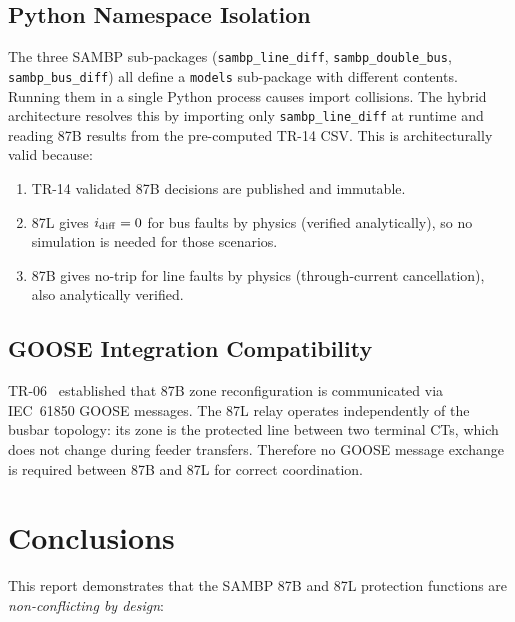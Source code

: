 \documentclass[11pt, a4paper]{article}
\begin{document}
\subsection{Python Namespace Isolation}

The three SAMBP sub-packages (\texttt{sambp\_line\_diff},
\texttt{sambp\_double\_bus}, \texttt{sambp\_bus\_diff}) all define a
\texttt{models} sub-package with different contents.  Running them in a
single Python process causes import collisions.  The hybrid architecture
resolves this by importing only \texttt{sambp\_line\_diff} at runtime and
reading 87B results from the pre-computed TR-14 CSV.  This is architecturally
valid because:

\begin{enumerate}
  \item TR-14 validated 87B decisions are published and immutable.
  \item 87L gives $i_{\rm diff}=0$ for bus faults by physics (verified
        analytically), so no simulation is needed for those scenarios.
  \item 87B gives no-trip for line faults by physics (through-current
        cancellation), also analytically verified.
\end{enumerate}

\subsection{GOOSE Integration Compatibility}

TR-06~\cite{IEC_61850_8_1} established that 87B zone reconfiguration is
communicated via IEC~61850 GOOSE messages.  The 87L relay operates
independently of the busbar topology: its zone is the protected line
between two terminal CTs, which does not change during feeder transfers.
Therefore no GOOSE message exchange is required between 87B and 87L for
correct coordination.


\section{Conclusions}
\label{sec:conclusions}

This report demonstrates that the SAMBP 87B and 87L protection functions
are \emph{non-conflicting by design}:
\end{document}
